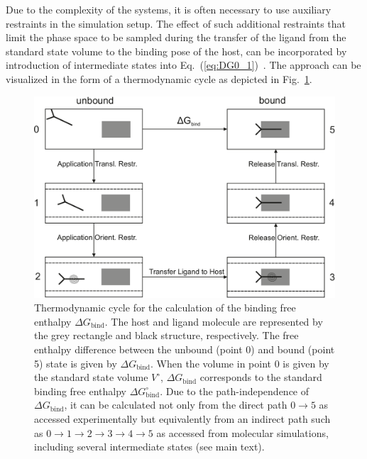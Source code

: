 \documentclass[9pt,lessons]{livecoms}
\begin{document}
Due to the complexity of the systems, it is often necessary to use auxiliary restraints in the simulation setup. 
The effect of such additional restraints that limit the phase space to be sampled during the transfer of the ligand from the standard state volume to the binding pose of the host, 
can be incorporated by introduction of intermediate states into Eq.~(\ref{eq:DG0_1})~\cite{woo2005calculation}.
The approach can be visualized in the form of a thermodynamic cycle as depicted in Fig.~\ref{fig:thermo_cycle}.
\begin{figure}[htb!]
\includegraphics[width=\linewidth]{figures/thermocycle.pdf}
\caption{Thermodynamic cycle for the calculation of the binding free enthalpy $\Delta G_\mathrm{bind}$.
The host and ligand molecule are represented by the grey rectangle and black structure, respectively.
The free enthalpy difference between the unbound (point 0) and bound (point 5) state is given by $\Delta G_\mathrm{bind}$. 
When the volume in point 0 is given by  the standard state volume $V^\circ$, $\Delta G_\mathrm{bind}$ corresponds to the standard binding free enthalpy $\Delta G^\circ_\mathrm{bind}$.
Due to the path-independence of $\Delta G_\mathrm{bind}$, it can be calculated not only from the direct path $0 \rightarrow 5$ as accessed experimentally but equivalently from an indirect path such as 
$0 \rightarrow 1  \rightarrow 2  \rightarrow 3  \rightarrow 4  \rightarrow 5$ as accessed from molecular simulations, including several intermediate states (see main text).
}
\label{fig:thermo_cycle}
\end{figure}
\end{document}

